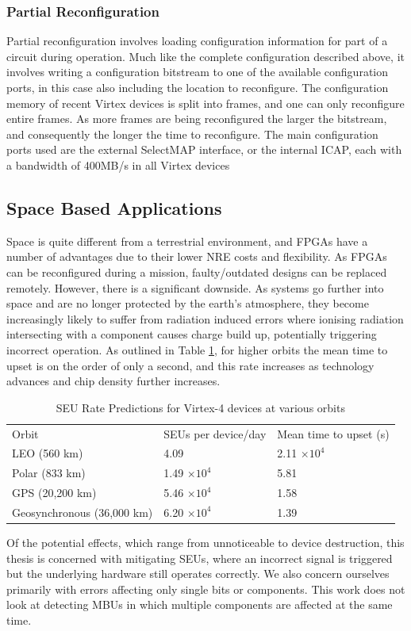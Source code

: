 \documentclass[12pt,drafta4paper,oneside]{memoir} %
\begin{document}
\subsubsection{Partial Reconfiguration}
Partial reconfiguration involves loading configuration information for part of a circuit during operation. Much like the complete configuration described above, it involves writing a configuration bitstream to one of the available configuration ports, in this case also including the location to reconfigure. The configuration memory of recent Virtex devices is split into frames, and one can only reconfigure entire frames. As more frames are being reconfigured the larger the bitstream, and consequently the longer the time to reconfigure. The main configuration ports used are the external SelectMAP interface, or the internal \ac{ICAP}, each with a bandwidth of 400MB/s in all Virtex devices \cite{XCell33,DiesselChange}


\subsection{Space Based Applications}
Space is quite different from a terrestrial environment, and \acp{FPGA} have a number of advantages due to their lower \ac{NRE} costs and flexibility. As \acp{FPGA} can be reconfigured during a mission, faulty/outdated designs can be replaced remotely. However, there is a significant downside. As systems go further into space and are no longer protected by the earth's atmosphere, they become increasingly likely to suffer from radiation induced errors where ionising radiation intersecting with a component causes charge build up, potentially triggering incorrect operation\cite{SEEMechanism}. As outlined in Table \ref{SEURate}, for higher orbits the mean time to upset is on the order of only a second, and this rate increases as technology advances and chip density further increases.
\begin{table}
    \begin{tabular}{lll}
    Orbit & SEUs per device/day &Mean time to upset (s)\\
    LEO (560 km) & 4.09 & 2.11 $\times 10^4$\\
    Polar (833 km) & 1.49 $\times 10^4$ & 5.81\\
    GPS (20,200 km) & 5.46 $\times 10^4$ & 1.58\\
    Geosynchronous (36,000 km) & 6.20 $\times 10^4$ & 1.39\\
    \end{tabular}
    \caption{SEU Rate Predictions for Virtex-4 devices at various orbits\cite{DiesselChange}}
    \label{SEURate}
\end{table}
Of the potential effects, which range from unnoticeable to device destruction, this thesis is concerned with mitigating \acp{SEU}, where an incorrect signal is triggered but the underlying hardware still operates correctly. We also concern ourselves primarily with errors affecting only single bits or components. This work does not look at detecting \acp{MBU} in which multiple components are affected at the same time.
\end{document}
